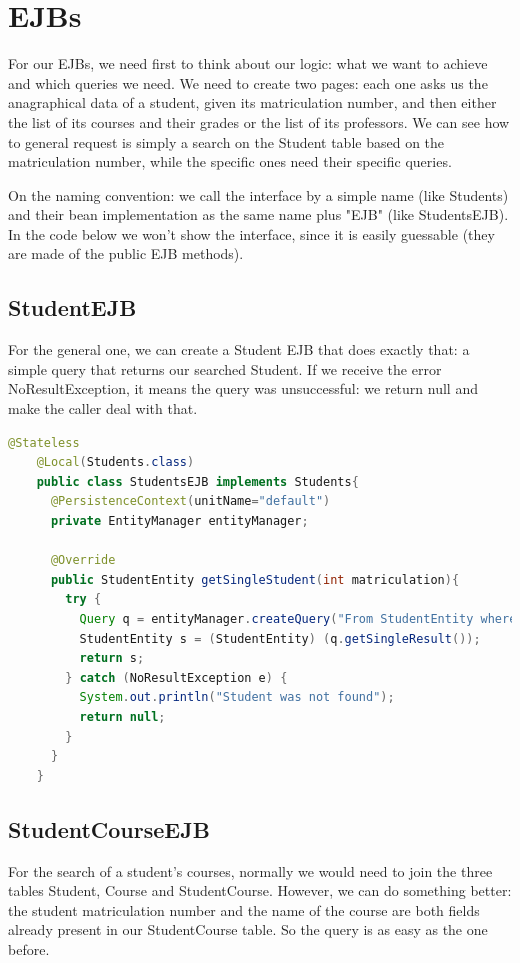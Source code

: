 \documentclass[12pt, a4paper]{article}
\begin{document}
  \section{EJBs}

  For our EJBs, we need first to think about our logic: what we want to achieve and which queries we need. We need to create two pages: each one asks us the anagraphical data of a student, given its matriculation number, and then either the list of its courses and their grades or the list of its professors. We can see how to general request is simply a search on the Student table based on the matriculation number, while the specific ones need their specific queries.

  On the naming convention: we call the interface by a simple name (like Students) and their bean implementation as the same name plus "EJB" (like StudentsEJB). In the code below we won't show the interface, since it is easily guessable (they are made of the public EJB methods).

  \subsection{StudentEJB}
  For the general one, we can create a Student EJB that does exactly that: a simple query that returns our searched Student. If we receive the error NoResultException, it means the query was unsuccessful: we return null and make the caller deal with that.
  
  \begin{lstlisting}[language=java, caption={StudentsEJB}]
    @Stateless
    @Local(Students.class)
    public class StudentsEJB implements Students{
      @PersistenceContext(unitName="default")
      private EntityManager entityManager;

      @Override
      public StudentEntity getSingleStudent(int matriculation){
        try {
          Query q = entityManager.createQuery("From StudentEntity where matriculation = " + matriculation);
          StudentEntity s = (StudentEntity) (q.getSingleResult());
          return s;
        } catch (NoResultException e) {
          System.out.println("Student was not found");
          return null;
        }
      }
    }
  \end{lstlisting}

  \subsection{StudentCourseEJB}
  For the search of a student's courses, normally we would need to join the three tables Student, Course and StudentCourse. However, we can do something better: the student matriculation number and the name of the course are both fields already present in our StudentCourse table. So the query is as easy as the one before.
\end{document}

